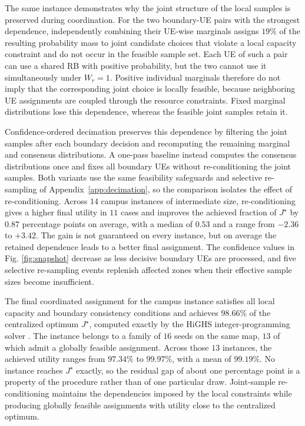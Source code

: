 The same instance demonstrates why the joint structure of the local samples is preserved during coordination. For the two boundary-UE pairs with the strongest dependence, independently combining their UE-wise marginals assigns $19\%$ of the resulting probability mass to joint candidate choices that violate a local capacity constraint and do not occur in the feasible sample set. Each UE of such a pair can use a shared RB with positive probability, but the two cannot use it simultaneously under $W_r=1$. Positive individual marginals therefore do not imply that the corresponding joint choice is locally feasible, because neighboring UE assignments are coupled through the resource constraints. Fixed marginal distributions lose this dependence, whereas the feasible joint samples retain it.

Confidence-ordered decimation preserves this dependence by filtering the joint samples after each boundary decision and recomputing the remaining marginal and consensus distributions. A one-pass baseline instead computes the consensus distributions once and fixes all boundary UEs without re-conditioning the joint samples. Both variants use the same feasibility safeguards and selective re-sampling of Appendix~\ref{app:decimation}, so the comparison isolates the effect of re-conditioning. Across $14$ campus instances of intermediate size, re-conditioning gives a higher final utility in $11$ cases and improves the achieved fraction of $J^\star$ by $0.87$ percentage points on average, with a median of $0.53$ and a range from $-2.36$ to $+3.42$. The gain is not guaranteed on every instance, but on average the retained dependence leads to a better final assignment. The confidence values in Fig. \ref{fig:snapshot} decrease as less decisive boundary UEs are processed, and five selective re-sampling events replenish affected zones when their effective sample sizes become insufficient.

The final coordinated assignment for the campus instance satisfies all local capacity and boundary consistency conditions and achieves $98.66\%$ of the centralized optimum $J^\star$, computed exactly by the HiGHS integer-programming solver \cite{highs}. The instance belongs to a family of $16$ seeds on the same map, $13$ of which admit a globally feasible assignment. Across those $13$ instances, the achieved utility ranges from $97.34\%$ to $99.97\%$, with a mean of $99.19\%$. No instance reaches $J^\star$ exactly, so the residual gap of about one percentage point is a property of the procedure rather than of one particular draw. Joint-sample re-conditioning maintains the dependencies imposed by the local constraints while producing globally feasible assignments with utility close to the centralized optimum.

